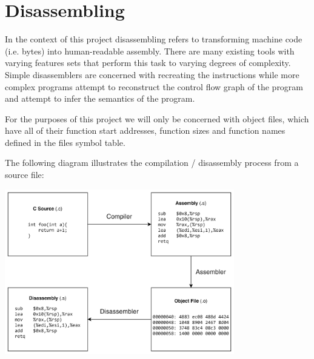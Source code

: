     
    



\section{Disassembling}\label{disassembling}
In the context of this project disassembling refers to transforming machine code (i.e. bytes) into human-readable assembly. There are many existing tools with varying features sets that perform this task\cite{brumley2011bap, objdump, gdb} to varying degrees of complexity. Simple disassemblers are concerned with recreating the instructions while more complex programs attempt to reconstruct the control flow graph of the program and attempt to infer the semantics of the program.

For the purposes of this project we will only be concerned with object files, which have all of their function start addresses, function sizes and function names defined in the files symbol table.

The following diagram illustrates the compilation / disassembly process from a source file:

\begin{center}
\includegraphics[width=0.75\textwidth]{disas.png}
\end{center}

